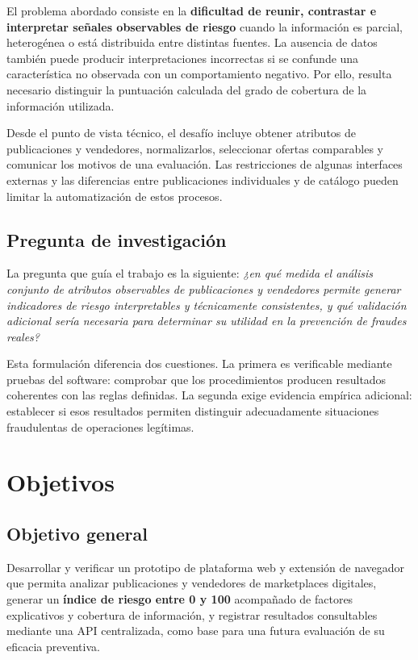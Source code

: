 El problema abordado consiste en la \textbf{dificultad de reunir, contrastar e interpretar señales observables de riesgo} cuando la información es parcial, heterogénea o está distribuida entre distintas fuentes. La ausencia de datos también puede producir interpretaciones incorrectas si se confunde una característica no observada con un comportamiento negativo. Por ello, resulta necesario distinguir la puntuación calculada del grado de cobertura de la información utilizada.

Desde el punto de vista técnico, el desafío incluye obtener atributos de publicaciones y vendedores, normalizarlos, seleccionar ofertas comparables y comunicar los motivos de una evaluación. Las restricciones de algunas interfaces externas y las diferencias entre publicaciones individuales y de catálogo pueden limitar la automatización de estos procesos.

\subsection{Pregunta de investigación}\label{subsec:ml-pregunta}

La pregunta que guía el trabajo es la siguiente: \emph{¿en qué medida el análisis conjunto de atributos observables de publicaciones y vendedores permite generar indicadores de riesgo interpretables y técnicamente consistentes, y qué validación adicional sería necesaria para determinar su utilidad en la prevención de fraudes reales?}

Esta formulación diferencia dos cuestiones. La primera es verificable mediante pruebas del software: comprobar que los procedimientos producen resultados coherentes con las reglas definidas. La segunda exige evidencia empírica adicional: establecer si esos resultados permiten distinguir adecuadamente situaciones fraudulentas de operaciones legítimas.

\section{Objetivos}\label{sec:ml-objetivos}

\subsection{Objetivo general}\label{subsec:ml-objetivo-general}

Desarrollar y verificar un prototipo de plataforma web y extensión de navegador que permita analizar publicaciones y vendedores de marketplaces digitales, generar un \textbf{índice de riesgo entre 0 y 100} acompañado de factores explicativos y cobertura de información, y registrar resultados consultables mediante una API centralizada, como base para una futura evaluación de su eficacia preventiva.

